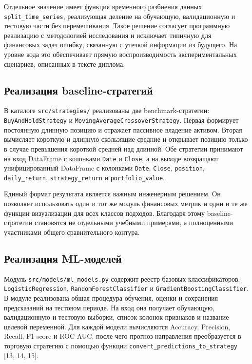 Отдельное значение имеет функция временного разбиения данных \texttt{split\_time\_series}, реализующая деление на обучающую, валидационную и тестовую части без перемешивания. Такое решение согласует программную реализацию с методологией исследования и исключает типичную для финансовых задач ошибку, связанную с утечкой информации из будущего. На уровне кода это обеспечивает прямую воспроизводимость экспериментальных сценариев, описанных в тексте диплома.

\subsection{Реализация baseline-стратегий}

В каталоге \texttt{src/strategies/} реализованы две benchmark-стратегии: \texttt{BuyAndHoldStrategy} и \texttt{MovingAverageCrossoverStrategy}. Первая формирует постоянную длинную позицию и отражает пассивное владение активом. Вторая вычисляет короткую и длинную скользящие средние и открывает позицию только в случае превышения короткой средней над длинной. Обе стратегии принимают на вход DataFrame с колонками \texttt{Date} и \texttt{Close}, а на выходе возвращают унифицированный DataFrame с колонками \texttt{Date}, \texttt{Close}, \texttt{position}, \texttt{daily\_return}, \texttt{strategy\_return} и \texttt{portfolio\_value}.

Единый формат результата является важным инженерным решением. Он позволяет использовать один и тот же модуль финансовых метрик и одни и те же функции визуализации для всех классов подходов. Благодаря этому baseline-стратегии становятся не отдельными учебными примерами, а полноценными участниками общего сравнительного контура.

\subsection{Реализация ML-моделей}

Модуль \texttt{src/models/ml\_models.py} содержит реестр базовых классификаторов: \texttt{LogisticRegression}, \texttt{RandomForestClassifier} и \texttt{GradientBoostingClassifier}. В модуле реализована общая процедура обучения, оценки и сохранения предсказаний на тестовом периоде. На вход она получает обучающую, валидационную и тестовую выборки, список колонок признаков и название целевой переменной. Для каждой модели вычисляются Accuracy, Precision, Recall, F1-score и ROC-AUC, после чего прогноз направления преобразуется в торговую стратегию с помощью функции \texttt{convert\_predictions\_to\_strategy} [13, 14, 15].

